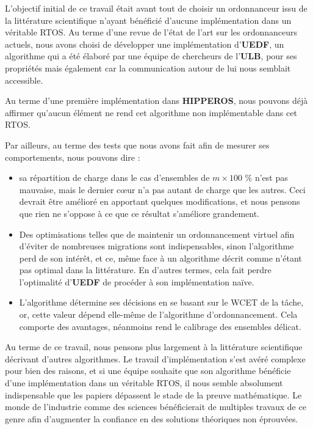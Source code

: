 L'objectif initial de ce travail était avant tout de choisir un ordonnanceur 
issu de la littérature scientifique n'ayant bénéficié d'aucune implémentation dans un véritable RTOS. 
Au terme d'une revue de l'état de l'art sur les ordonnanceurs actuels,
nous avons choisi de développer une implémentation d'\textbf{UEDF}, un algorithme qui a été élaboré par une 
équipe de chercheurs de l'\textbf{ULB}, pour ses propriétés mais également 
car la communication autour de lui nous semblait accessible.\newline

Au terme d'une première implémentation dans \textbf{HIPPEROS}, nous pouvons déjà affirmer 
qu'aucun élément ne rend cet algorithme non implémentable dans cet RTOS.\newline

Par ailleurs, au terme des tests que nous avons fait afin de mesurer ses comportements, nous pouvons dire :
\begin{itemize}
	\item sa répartition de charge dans le cas d'ensembles de $m \times 100$ \% n'est pas mauvaise, mais le dernier cœur 
	n'a pas autant de charge que les autres. Ceci devrait être amélioré en apportant quelques modifications, et nous 
	pensons que rien ne s'oppose à ce que ce résultat s'améliore grandement. 
	\item Des optimisations telles que de maintenir un ordonnancement virtuel afin d'éviter de nombreuses migrations sont 
	indispensables, sinon l'algorithme perd de son intérêt, et ce, même face à un algorithme décrit comme n'étant pas 
	optimal dans la littérature. En d'autres termes, cela fait perdre l'optimalité d'\textbf{UEDF} de procéder 
	à son implémentation \og{}naïve\fg{}. 
	\item L'algorithme détermine ses décisions en se basant sur le WCET de la tâche, or, cette valeur dépend elle-même de 
	l'algorithme d'ordonnancement. Cela comporte des avantages, néanmoins rend le calibrage des ensembles délicat. 
\end{itemize}

Au terme de ce travail, nous pensons plus largement à la littérature scientifique décrivant d'autres algorithmes. 
Le travail d'implémentation s'est avéré complexe pour bien des raisons, et si une équipe souhaite que son algorithme 
bénéficie d'une implémentation dans un véritable RTOS, il nous semble absolument indispensable 
que les papiers dépassent le stade de la preuve mathématique. 
Le monde de l'industrie comme des sciences bénéficierait de multiples travaux de ce genre 
afin d'augmenter la confiance en des solutions théoriques non éprouvées.
\newline
\newpage